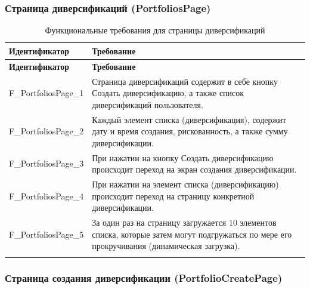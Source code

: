 \documentclass[a4paper, 14pt]{article}
\begin{document}
\subsubsection{Страница диверсификаций (PortfoliosPage)}

\begin{longtable}{| p{} | p{} |}
    \hline
    \textbf{Идентификатор}          & \textbf{Требование}                                                                                                                                                                \\
    \hline
    \endfirsthead
    \hline
    \textbf{Идентификатор}          & \textbf{Требование}                                                                                                                                                                \\
    \hline
    \endhead

    F\_PortfoliosPage\_1      & Страница диверсификаций содержит в себе кнопку Создать диверсификацию, а также список диверсификаций пользователя.                                                                 \\ \hline
    F\_PortfoliosPage\_2      & Каждый элемент списка (диверсификация), содержит дату и время создания, рискованность, а также сумму диверсификации.                                                               \\ \hline
    F\_PortfoliosPage\_3      & При нажатии на кнопку Создать диверсификацию происходит переход на экран создания диверсификации.                                                                                  \\ \hline
    F\_PortfoliosPage\_4      & При нажатии на элемент списка (диверсификацию) происходит переход на страницу конкретной диверсификации.                                                                           \\ \hline
    F\_PortfoliosPage\_5                & За один раз на страницу загружается 10 элементов списка, которые затем могут подгружаться по мере его прокручивания (динамическая загрузка).                             \\ \hline

    \caption{Функциональные требования для страницы диверсификаций}
\end{longtable}

\subsubsection{Страница создания диверсификации (PortfolioCreatePage)}
\end{document}
